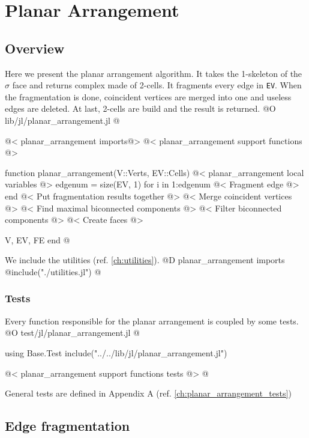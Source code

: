 \chapter{Planar Arrangement}
\label{ch:planar_arrangement}

\section{Overview}
Here we present the planar arrangement algorithm. It takes the 1-skeleton of the $\sigma$ face and returns complex made of 2-cells.
It fragments every edge in \texttt{EV}. 
When the fragmentation is done, coincident vertices are merged into one and useless edges are deleted. At last,
2-cells are build and the result is returned.
@O lib/jl/planar_arrangement.jl
@{@< planar\_arrangement imports@>
@< planar\_arrangement support functions @>

function planar_arrangement(V::Verts, EV::Cells)
    @< planar\_arrangement local variables @>
    edgenum = size(EV, 1)
    for i in 1:edgenum
        @< Fragment edge @>
    end
    @< Put fragmentation results together @>
    @< Merge coincident vertices @>
    @< Find maximal biconnected components @>
    @< Filter biconnected components @>
    @< Create faces @>

    V, EV, FE
end 
@}
We include the utilities (ref. \ref{ch:utilities}).
@D planar\_arrangement imports
@{include("./utilities.jl")
@}
\subsection{Tests}
Every function responsible for the planar arrangement is coupled by some tests. 
@O test/jl/planar_arrangement.jl
@{using Base.Test
include("../../lib/jl/planar_arrangement.jl")

@< planar\_arrangement support functions tests @>
@}
General tests are defined in Appendix A (ref. \ref{ch:planar_arrangement_tests})










\section{Edge fragmentation}
